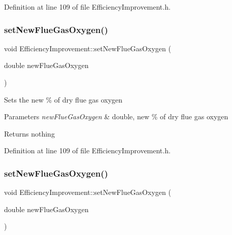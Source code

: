 Definition at line 109 of file Efficiency\+Improvement.\+h.

\mbox{\label{class_efficiency_improvement_a111f7e30d302b4e71103a2ec6d199e2c}} 
\subsubsection{\texorpdfstring{set\+New\+Flue\+Gas\+Oxygen()}{setNewFlueGasOxygen()}\hspace{0.1cm}{\footnotesize\ttfamily [2/3]}}
{\footnotesize\ttfamily void Efficiency\+Improvement\+::set\+New\+Flue\+Gas\+Oxygen (\begin{DoxyParamCaption}\item[{double}]{new\+Flue\+Gas\+Oxygen }\end{DoxyParamCaption})\hspace{0.3cm}{\ttfamily [inline]}}

Sets the new \% of dry flue gas oxygen


\begin{DoxyParams}{Parameters}
{\em new\+Flue\+Gas\+Oxygen} & double, new \% of dry flue gas oxygen\\
\hline
\end{DoxyParams}
\begin{DoxyReturn}{Returns}
nothing 
\end{DoxyReturn}


Definition at line 109 of file Efficiency\+Improvement.\+h.

\mbox{\label{class_efficiency_improvement_a111f7e30d302b4e71103a2ec6d199e2c}} 
\subsubsection{\texorpdfstring{set\+New\+Flue\+Gas\+Oxygen()}{setNewFlueGasOxygen()}\hspace{0.1cm}{\footnotesize\ttfamily [3/3]}}
{\footnotesize\ttfamily void Efficiency\+Improvement\+::set\+New\+Flue\+Gas\+Oxygen (\begin{DoxyParamCaption}\item[{double}]{new\+Flue\+Gas\+Oxygen }\end{DoxyParamCaption})\hspace{0.3cm}{\ttfamily [inline]}}

